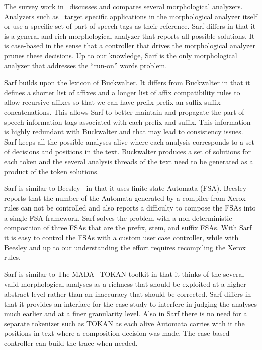\documentclass[11pt,letterpaper]{article}
\begin{document}
The survey work in~\cite{Sughaiyer:04} discusses and compares
several morphological analyzers. 
Analyzers such as~\cite{Khoja:01,Darwish:02} 
target specific applications in the morphological 
analyzer itself or use a specific set of part of speech tags
as their reference.
Sarf differs in that it is a general and rich morphological 
analyzer that reports all possible solutions. 
It is case-based in the sense that a controller that drives
the morphological analyzer prunes these decisions. 
Up to our knowledge, Sarf is the only morphological analyzer
that addresses the ``run-on'' words problem. 

Sarf builds upon the lexicon of Buckwalter.
It differs from Buckwalter in that it defines a shorter list of affixes
and a longer list of affix compatibility rules to allow recursive 
affixes so that we can have prefix-prefix an suffix-suffix 
concatenations.
This allows Sarf to better maintain and propagate 
the part of speech information
tags associated with each prefix and suffix.
This information is highly 
redundant with Buckwalter and that may lead to consistency issues. 
Sarf keeps all the possible analyses alive where each analysis
corresponds to a set of decisions and positions in the text. 
Buckwalter produces a set of solutions for each token 
and the several analysis threads of the text need to be 
generated as a product of the token solutions. 

Sarf is similar to Beesley~ in that it uses
finite-state Automata (FSA). 
Beesley reports that the number of the Automata generated by a compiler
from Xerox rules can not be controlled and also reports a difficulty to 
compose the FSAs into a single FSA framework. 
Sarf solves the problem with a non-deterministic composition of three
FSAs that are the prefix, stem, and suffix FSAs. 
With Sarf it is easy to control the FSAs with a custom user case 
controller, while with Beesley and up to our understanding the 
effort requires recompiling the Xerox rules.

Sarf is similar to The MADA+TOKAN toolkit in that it thinks of
the several valid morphological analyses as a richness that 
should be exploited at a higher abstract level rather than
an inaccuracy that should be corrected. 
Sarf differs in that it provides an interface for the 
case study to interfere in judging the analyses much earlier and
at a finer granularity level. 
Also in Sarf there is no need for a separate tokenizer such as
TOKAN as each alive Automata carries with it the positions in 
text where a composition decision was made. 
The case-based controller can build the trace 
when needed. 
\end{document}

